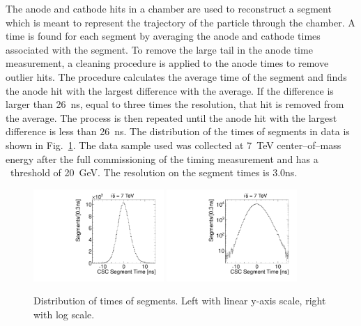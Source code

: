 The anode and cathode hits in a chamber are used to reconstruct a segment which is meant to represent the trajectory of the particle through the chamber. A time is
found for each segment by averaging the anode and cathode times associated with the segment. 
To remove the large tail in the anode time measurement,
a cleaning procedure is applied to the anode times to remove outlier hits. The procedure calculates the average time of the segment and finds the anode hit with the largest
difference with the average. If the difference is larger than 26~ns, equal to three times the resolution,
that hit is removed from the average. The process is then repeated until the
anode hit with the largest difference is less than 26~ns.
The distribution of the times of segments in data is shown in Fig.~\ref{fig:SegTimes}. 
The data sample used was collected at 7~TeV center--of--mass energy after the full commissioning of the timing measurement and has a \pt\ threshold of 20~GeV.
The resolution on the segment times is 3.0ns.

\begin{figure}
  \begin{center}
      \includegraphics[width=0.44\textwidth]{figures/timing/StripAndWireSegmentTime}
      \includegraphics[width=0.44\textwidth]{figures/timing/StripAndWireSegmentTimeLog}
      \caption[Distribution of times of segments.]
      {Distribution of times of segments. Left with linear y-axis scale, right with log scale.
        }
      \label{fig:SegTimes}
  \end{center}
\end{figure}

